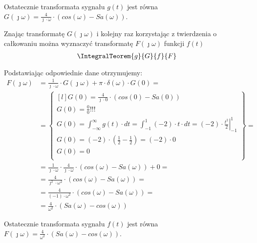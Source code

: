 \begin{task}
Ostatecznie transformata sygnału $g(t)$ jest równa $G(\jmath \omega)=\frac{4}{\jmath \cdot \omega} \cdot \left(cos\left( \omega\right) - Sa\left( \omega\right)\right)$.

Znając transformatę $G(\jmath \omega)$ i kolejny raz korzystając z twierdzenia o całkowaniu można wyznaczyć transformatę $F(\jmath \omega)$ funkcji $f(t)$
\begin{align*}
\IntegralTeorem{g}{G}{f}{F}
\end{align*}

Podstawiając odpowiednie dane otrzymujemy:
\begin{align*}
F(\jmath \omega) &= \frac{1}{\jmath \cdot \omega} \cdot G(\jmath \omega) + \pi \cdot \delta(\omega) \cdot G(0)=\\
&=\begin{Bmatrix*}[l]
G(0)=\frac{4}{\jmath \cdot 0} \cdot \left(cos\left( 0\right) - Sa\left(0\right)\right)\\
G(0)=\frac{0}{0}!!!\\
G(0)=\int_{-\infty}^{\infty} g(t) \cdot dt=\int_{-1}^{1} (-2) \cdot t \cdot dt = \left. (-2)\cdot \frac{t^2}{2} \right|_{-1}^{1}\\
G(0)=(-2) \cdot \left(\frac{1}{2} - \frac{1}{2}\right)= (-2) \cdot 0\\
G(0)=0\\
\end{Bmatrix*}=\\
&=\frac{1}{\jmath \cdot \omega} \cdot \frac{4}{\jmath \cdot \omega} \cdot \left(cos\left( \omega\right) - Sa\left( \omega\right)\right) + 0=\\
&=\frac{4}{\jmath^2 \cdot \omega^2} \cdot \left(cos\left( \omega\right) - Sa\left( \omega\right)\right)=\\
&=\frac{4}{(-1) \cdot \omega^2} \cdot \left(cos\left( \omega\right) - Sa\left( \omega\right)\right)=\\
&=\frac{4}{\omega^2} \cdot \left(Sa\left( \omega\right) - cos\left( \omega\right)\right)
\end{align*}

Ostatecznie transformata sygnału $f(t)$ jest równa $F(\jmath \omega)=\frac{4}{\omega^2} \cdot \left(Sa\left( \omega\right) - cos\left( \omega\right)\right)$.
\end{task}

